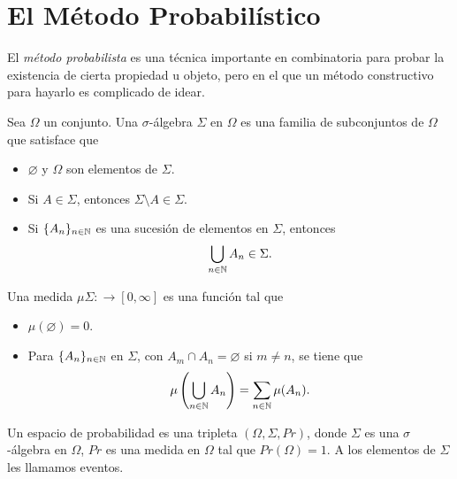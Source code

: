 \section{El Método Probabilístico}
El \textit{método probabilista} es una técnica importante en
combinatoria para probar la existencia de cierta propiedad u objeto, pero en el
que un método constructivo para hayarlo es complicado de idear.

\begin{definition}
  Sea $\Omega$ un conjunto. Una $\sigma$-álgebra $\Sigma$ en $\Omega$ es una
  familia de subconjuntos de $\Omega$ que satisface que
  \begin{itemize}
    \item $\varnothing$ y $\Omega $ son elementos de $\Sigma$.\\
    \item Si $A \in \Sigma$, entonces $\Sigma \setminus A \in \Sigma$.\\
    \item Si $\{A_n\}_{n\in \mathbb{N}}$ es una sucesión de elementos en
      $\Sigma$, entonces
      $$\bigcup_{n \in \mathbb{N}} A_n \in \Sigma.$$
  \end{itemize}
\end{definition}

\begin{definition}[medida]
  Una medida $\mu \Sigma: \rightarrow [0, \infty]$ es una función tal que
  \begin{itemize}
    \item $\mu(\varnothing) = 0$.\\
    \item Para $\{A_n\}_{n\in \mathbb{N}}$ en $\Sigma$, con $A_m \cap A_n =
      \varnothing$ si $m \neq n$, se tiene que
      $$ \mu\left( \bigcup_{n \in \mathbb{N}} A_n \right) = \sum_{n \in \mathbb{N}} \mu(A_n).$$
  \end{itemize}
\end{definition}

\begin{definition}
  Un espacio de probabilidad es una tripleta $(\Omega, \Sigma, Pr)$,
  donde $\Sigma$ es una $\sigma$-álgebra en $\Omega$, $Pr$ es una
  medida en $\Omega$ tal que $Pr(\Omega) = 1$. A los elementos de
  $\Sigma$ les llamamos eventos.
\end{definition}

